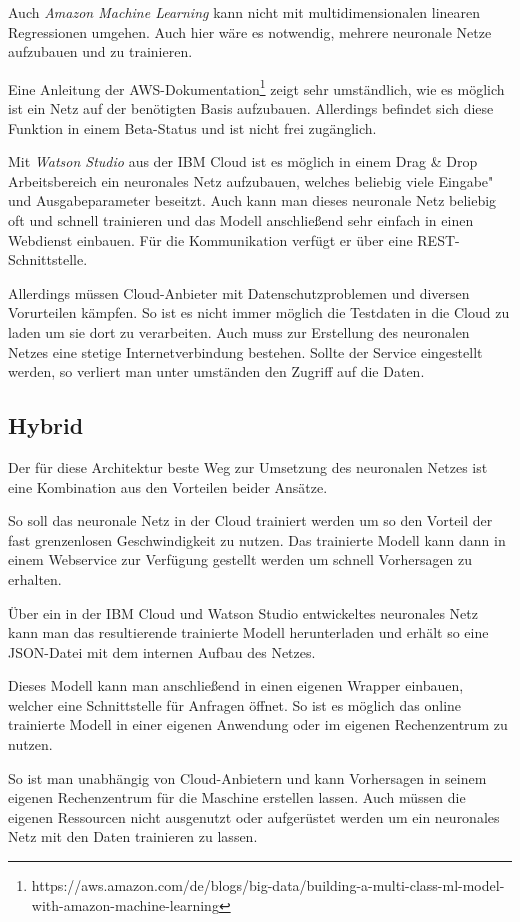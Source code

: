Auch \textit{Amazon Machine Learning} kann nicht mit multidimensionalen linearen Regressionen umgehen. Auch hier wäre es
notwendig, mehrere neuronale Netze aufzubauen und zu trainieren.

Eine Anleitung der
AWS-Dokumentation\footnote{https://aws.amazon.com/de/blogs/big-data/building-a-multi-class-ml-model-with-amazon-machine-learning}
zeigt sehr umständlich, wie es möglich ist ein Netz auf der benötigten Basis aufzubauen. Allerdings befindet sich diese
Funktion in einem Beta-Status und ist nicht frei zugänglich.

Mit \textit{Watson Studio} aus der IBM Cloud ist es möglich in einem Drag \& Drop Arbeitsbereich ein neuronales Netz
aufzubauen, welches beliebig viele Eingabe"~ und Ausgabeparameter beseitzt. Auch kann man dieses neuronale Netz beliebig
oft und schnell trainieren und das Modell anschließend sehr einfach in einen Webdienst einbauen. Für die Kommunikation
verfügt er über eine REST-Schnittstelle.

Allerdings müssen Cloud-Anbieter mit Datenschutzproblemen und diversen Vorurteilen kämpfen. So ist es nicht immer
möglich die Testdaten in die Cloud zu laden um sie dort zu verarbeiten. Auch muss zur Erstellung des neuronalen Netzes
eine stetige Internetverbindung bestehen. Sollte der Service eingestellt werden, so verliert man unter umständen den
Zugriff auf die Daten.

\subsection{Hybrid}
Der für diese Architektur beste Weg zur Umsetzung des neuronalen Netzes ist eine Kombination aus den Vorteilen beider
Ansätze.

So soll das neuronale Netz in der Cloud trainiert werden um so den Vorteil der fast grenzenlosen Geschwindigkeit zu
nutzen. Das trainierte Modell kann dann in einem Webservice zur Verfügung gestellt werden um schnell Vorhersagen zu
erhalten.

Über ein in der IBM Cloud und Watson Studio entwickeltes neuronales Netz kann man das resultierende trainierte Modell
herunterladen und erhält so eine JSON-Datei mit dem internen Aufbau des Netzes.

Dieses Modell kann man anschließend in einen eigenen Wrapper einbauen, welcher eine Schnittstelle für Anfragen öffnet.
So ist es möglich das online trainierte Modell in einer eigenen Anwendung oder im eigenen Rechenzentrum zu nutzen.

So ist man unabhängig von Cloud-Anbietern und kann Vorhersagen in seinem eigenen Rechenzentrum für die Maschine
erstellen lassen. Auch müssen die eigenen Ressourcen nicht ausgenutzt oder aufgerüstet werden um ein neuronales Netz mit
den Daten trainieren zu lassen.